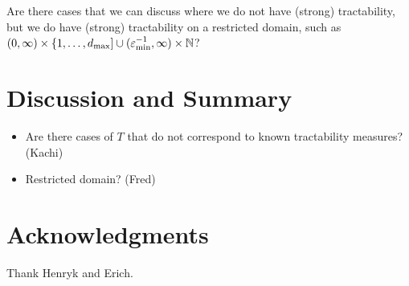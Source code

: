 \documentclass[sort&compress]{elsarticle}
\newcommand{\fred}[1]{\begingroup\color{blue}#1\endgroup}
\begin{document}
\fred{Are there cases that we can discuss where we do not have (strong) tractability, but we do have (strong) tractability on a restricted domain, such as $(0,\infty) \times \{1, \ldots, d_{\max}] \cup (\varepsilon_{\min}^{-1},\infty) \times \mathbb{N}$?}




\section{Discussion and Summary}

\fred{
\begin{itemize}
\item Are there cases of $T$ that do not correspond to known tractability measures? (Kachi)
\item Restricted domain? (Fred)
\end{itemize}}

\section{Acknowledgments}
Thank Henryk and Erich.



\end{document}
